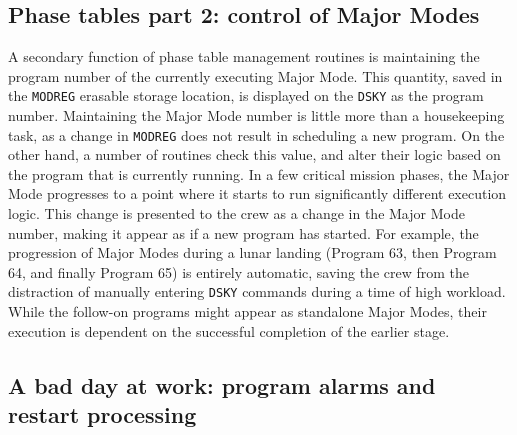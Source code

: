 \documentclass[refcap, oxford]{ahsan}
\begin{document}



\subsection{Phase tables part 2: control of Major Modes}

A secondary function of phase table management routines is maintaining the program number of the currently executing Major Mode. This quantity, saved in the \texttt{MODREG} erasable storage location, is displayed on the \texttt{DSKY} as the program number. Maintaining the Major Mode number is little more than a housekeeping task, as a change in \texttt{MODREG} does not result in scheduling a new program. On the other hand, a number of routines check this value, and alter their logic based on the program that is currently running. In a few critical mission phases, the Major Mode progresses to a point where it starts to run significantly different execution logic. This change is presented to the crew as a change in the Major Mode number, making it appear as if a new program has started. For example, the progression of Major Modes during a lunar landing (Program 63, then Program 64, and finally Program 65) is entirely automatic, saving the crew from the distraction of manually entering \texttt{DSKY} commands during a time of high workload. While the follow-on programs might appear as standalone Major Modes, their execution is dependent on the successful completion of the earlier stage.


\subsection{A bad day at work: program alarms and restart processing}
\end{document}
